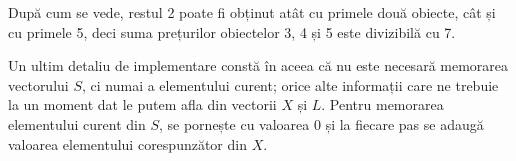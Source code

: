 După cum se vede, restul 2 poate fi obținut atât cu primele două obiecte, cât
și cu primele 5, deci suma prețurilor obiectelor 3, 4 și 5 este divizibilă cu
7.

Un ultim detaliu de implementare constă în aceea că nu este necesară memorarea
vectorului $S$, ci numai a elementului curent; orice alte informații care ne
trebuie la un moment dat le putem afla din vectorii $X$ și $L$. Pentru
memorarea elementului curent din $S$, se pornește cu valoarea 0 și la fiecare
pas se adaugă valoarea elementului corespunzător din $X$.

\inputminted{c}{src/problem15.c}
